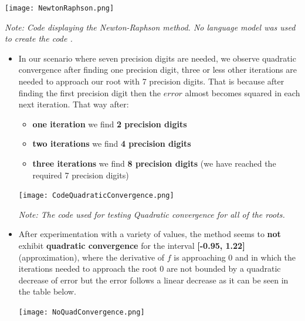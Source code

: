 \documentclass{article}
\begin{document}
\begin{tcolorbox}[colback=gray!10, colframe=gray!80, width=\textwidth, sharp corners]
    \centering 
    \texttt{[image: NewtonRaphson.png]} 

    \vspace{0.5cm} 
    
    \small\textit{Note: Code displaying the Newton-Raphson method. No language model was used to create the code .}
\end{tcolorbox}

 \begin{itemize}

    \item In our scenario where seven precision digits are needed, we observe quadratic convergence after finding one precision digit, three or less other iterations are needed to approach our root with 7 precision digits. That is because after finding the first precision digit then the $error$ almost becomes squared in each next iteration. That way after:
    \begin{itemize}
        \item \textbf{one iteration} we find \textbf{2 precision digits}
        \item \textbf{two iterations} we find \textbf{4 precision digits}
        \item \textbf{three iterations} we find \textbf{8 precision digits} (we have reached the required 7 precision digits)
    \end{itemize}


\begin{tcolorbox}[colback=gray!10, colframe=gray!80, width=\textwidth, sharp corners]
    \centering 
    \texttt{[image: CodeQuadraticConvergence.png]} 

    \vspace{0.5cm} 
    
    \small\textit{Note: The code used for testing Quadratic convergence for all of the roots.}
\end{tcolorbox}
    
    
    \item After experimentation with a variety of values, the method seems to \textbf{not} exhibit \textbf{quadratic convergence} for the interval \textbf{[-0.95, 1.22]} (approximation), where the derivative of $f$ is approaching $0$ and in which the iterations needed to approach the root 0 are not bounded by a quadratic decrease of error but the error follows a linear decrease as it can be seen in the table below.
    \begin{tcolorbox}[colback=gray!10, colframe=gray!80, width=\textwidth, sharp corners]
    \centering 
    \texttt{[image: NoQuadConvergence.png]} 


\end{tcolorbox}
\end{itemize}
\end{document}

